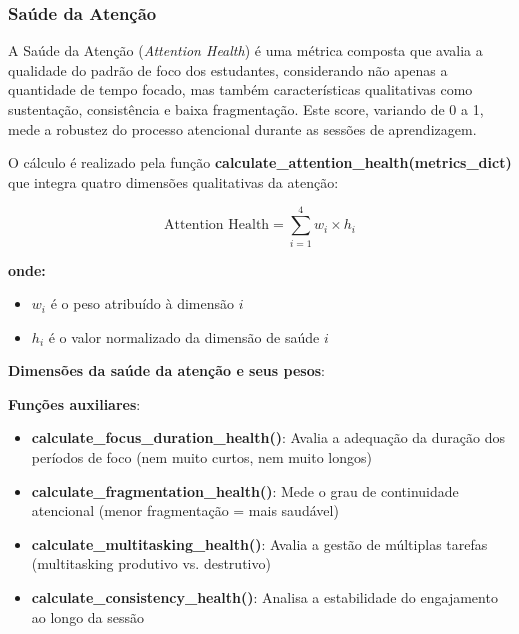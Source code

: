 \subsubsection{Saúde da Atenção}
A Saúde da Atenção (\textit{Attention Health}) é uma métrica composta que avalia a qualidade do padrão de foco dos estudantes, considerando não apenas a quantidade de tempo focado, mas também características qualitativas como sustentação, consistência e baixa fragmentação. Este score, variando de 0 a 1, mede a robustez do processo atencional durante as sessões de aprendizagem.

O cálculo é realizado pela função \textbf{calculate\_attention\_health(metrics\_dict)} que integra quatro dimensões qualitativas da atenção:

\begin{equation}
\text{Attention Health} = \sum_{i=1}^{4} w_i \times h_i
\end{equation}

\textbf{onde:}
\begin{itemize}
    \item $w_i$ é o peso atribuído à dimensão $i$
    \item $h_i$ é o valor normalizado da dimensão de saúde $i$
\end{itemize}


% 

\textbf{Dimensões da saúde da atenção e seus pesos}:


\textbf{Funções auxiliares}:
\begin{itemize}
    \item \textbf{calculate\_focus\_duration\_health()}: Avalia a adequação da duração dos períodos de foco (nem muito curtos, nem muito longos)
    \item \textbf{calculate\_fragmentation\_health()}: Mede o grau de continuidade atencional (menor fragmentação = mais saudável)
    \item \textbf{calculate\_multitasking\_health()}: Avalia a gestão de múltiplas tarefas (multitasking produtivo vs. destrutivo)
    \item \textbf{calculate\_consistency\_health()}: Analisa a estabilidade do engajamento ao longo da sessão
\end{itemize}

